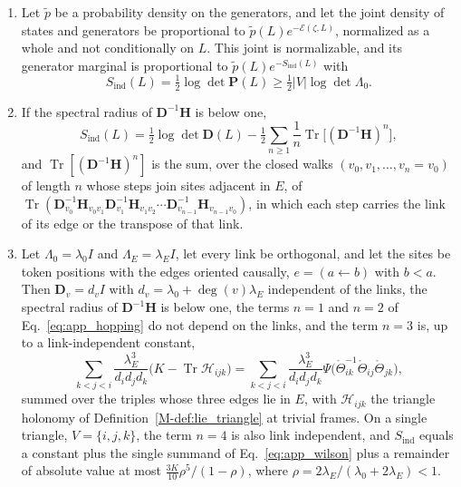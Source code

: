 \documentclass[twoside,11pt]{article}
\begin{document}
\begin{proposition}
\label{prop:app_induced}
\begin{enumerate}
\item Let $\tilde p$ be a probability density on the generators, and let the joint density of states and generators be proportional to $\tilde p(L)e^{-\mathcal E(\zeta,L)}$, normalized as a whole and not conditionally on $L$. This joint is normalizable, and its generator marginal is proportional to $\tilde p(L)e^{-S_{\mathrm{ind}}(L)}$ with
\begin{equation}
S_{\mathrm{ind}}(L)=\tfrac12\log\det\mathbf P(L)\ge\tfrac12|V|\log\det\Lambda_0.
\label{eq:app_induced_action}
\end{equation}
\item If the spectral radius of $\mathbf D^{-1}\mathbf H$ is below one,
\begin{equation}
S_{\mathrm{ind}}(L)=\tfrac12\log\det\mathbf D(L)-\tfrac12\sum_{n\ge1}\frac1n\operatorname{Tr}\bigl[(\mathbf D^{-1}\mathbf H)^n\bigr],
\label{eq:app_hopping}
\end{equation}
and $\operatorname{Tr}[(\mathbf D^{-1}\mathbf H)^n]$ is the sum, over the closed walks $(v_0,v_1,\ldots,v_n=v_0)$ of length $n$ whose steps join sites adjacent in $E$, of $\operatorname{Tr}(\mathbf D_{v_0}^{-1}\mathbf H_{v_0v_1}\mathbf D_{v_1}^{-1}\mathbf H_{v_1v_2}\cdots\mathbf D_{v_{n-1}}^{-1}\mathbf H_{v_{n-1}v_0})$, in which each step carries the link of its edge or the transpose of that link.
\item Let $\Lambda_0=\lambda_0I$ and $\Lambda_E=\lambda_EI$, let every link be orthogonal, and let the sites be token positions with the edges oriented causally, $e=(a\leftarrow b)$ with $b<a$. Then $\mathbf D_v=d_vI$ with $d_v=\lambda_0+\deg(v)\lambda_E$ independent of the links, the spectral radius of $\mathbf D^{-1}\mathbf H$ is below one, the terms $n=1$ and $n=2$ of Eq.~\eqref{eq:app_hopping} do not depend on the links, and the term $n=3$ is, up to a link-independent constant,
\begin{equation}
\sum_{k<j<i}\frac{\lambda_E^3}{d_id_jd_k}\bigl(K-\operatorname{Tr}\mathcal H_{ijk}\bigr)=\sum_{k<j<i}\frac{\lambda_E^3}{d_id_jd_k}\Psi\bigl(\mathring\Theta_{ik}^{-1}\mathring\Theta_{ij}\mathring\Theta_{jk}\bigr),
\label{eq:app_wilson}
\end{equation}
summed over the triples whose three edges lie in $E$, with $\mathcal H_{ijk}$ the triangle holonomy of Definition~\ref{M-def:lie_triangle} at trivial frames. On a single triangle, $V=\{i,j,k\}$, the term $n=4$ is also link independent, and $S_{\mathrm{ind}}$ equals a constant plus the single summand of Eq.~\eqref{eq:app_wilson} plus a remainder of absolute value at most $\tfrac{3K}{10}\rho^5/(1-\rho)$, where $\rho=2\lambda_E/(\lambda_0+2\lambda_E)<1$.
\end{enumerate}
\end{proposition}
\end{document}
